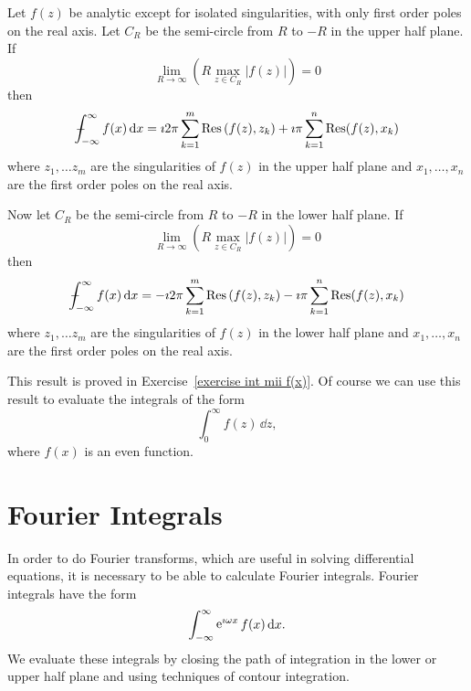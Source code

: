 \begin{Result}
  \label{result int mii f(x)}
  Let $f(z)$ be analytic except for isolated singularities, with only 
  first order poles on the real axis.  
  Let $C_R$ be the semi-circle from $R$ to $-R$ in the upper half plane.  If
  \[
  \lim_{R \to \infty} \left( R \max_{z \in C_R} |f(z)| \right) = 0
  \]
  then
  \[
  - \negthickspace \negthickspace \negthickspace \negmedspace \int_{-\infty}^\infty f(x) \,\mathrm{d} x = \imath 2 \pi \sum_{k=1}^m \mathop{\mathrm{Res}}\nolimits \left( f(z), z_k \right)
  + \imath \pi \sum_{k=1}^n \mathop{\mathrm{Res}}\nolimits( f(z), x_k )
  \]
  where $z_1, \ldots z_m$ are the singularities of $f(z)$ in the upper half 
  plane and $x_1, \ldots, x_n$ are the first order poles on the real axis.  

  Now let $C_R$ be the semi-circle from $R$ to $-R$ in the lower half plane.
  If
  \[
  \lim_{R \to \infty} \left( R \max_{z \in C_R} |f(z)| \right) = 0
  \]
  then
  \[
  - \negthickspace \negthickspace \negthickspace \negmedspace \int_{-\infty}^\infty f(x) \,\mathrm{d} x = - \imath 2 \pi \sum_{k=1}^m \mathop{\mathrm{Res}}\nolimits \left( f(z), z_k \right)
  - \imath \pi \sum_{k=1}^n \mathop{\mathrm{Res}}\nolimits( f(z), x_k )
  \]
  where $z_1, \ldots z_m$ are the singularities of $f(z)$ in the lower half 
  plane and $x_1, \ldots, x_n$ are the first order poles on the real axis.  
\end{Result}



This result is proved in Exercise~\ref{exercise int mii f(x)}.  Of course
we can use this result to evaluate the integrals of the form
\[
\int_0^\infty f(z)\,\dd z,
\]
where $f(x)$ is an even function.











\section{Fourier Integrals}




In order to do Fourier transforms, which are useful in solving differential
equations, it is necessary to be able to calculate Fourier integrals.  
Fourier integrals have the form
\[
\int_{-\infty}^\infty \mathop{\mathrm{e}}\nolimits^{\imath \omega x} f(x) \,\mathrm{d} x.
\]
We evaluate these integrals by closing the path of integration in the lower
or upper half plane and using techniques of contour integration.




